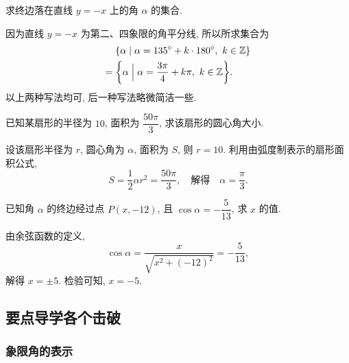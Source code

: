 \begin{exercise}
    求终边落在直线 $y=-x$ 上的角 $\alpha$ 的集合.
\end{exercise}
\beginsolution
    因为直线 $y=-x$ 为第二、四象限的角平分线, 
    所以所求集合为
    \[\begin{aligned}
        &\{\alpha\mid \alpha= 135^\circ+ k\cdot 180^\circ,\ k\in\mathbb{Z}\}\\
        ={}& \biggl\{\alpha\Bigm| \alpha= \frac{3\pi}{4}+ k\pi,\ k\in\mathbb{Z}\biggr\}.
    \end{aligned}\]
    以上两种写法均可, 后一种写法略微简洁一些.
\endsolution

\begin{exercise}
    已知某扇形的半径为 $10$, 面积为 $\dfrac{50\pi}3$, 求该扇形的圆心角大小.
\end{exercise}
\beginsolution
    设该扇形半径为 $r$, 圆心角为 $\alpha$, 面积为 $S$, 则 $r=10$. 利用由弧度制表示的扇形面积公式, 
    \[S= \frac12\alpha r^2= \dfrac{50\pi}3,\quad
        \text{解得}\quad
        \alpha= \frac\pi3.\]
\endsolution

\begin{exercise}
    已知角 $\alpha$ 的终边经过点 $P(x,-12)$,  且 $\cos\alpha= -\dfrac5{13}$, 求 $x$ 的值.
\end{exercise}

\beginsolution
    由余弦函数的定义, 
    \[\cos\alpha= \frac{x}{\sqrt{x^2+(-12)^2}}= -\dfrac5{13},\]
    解得 $x=\pm5$. 检验可知, $x=-5$.
\endsolution

\subsection{要点导学\quad 各个击破}
\subsubsection{象限角的表示}

